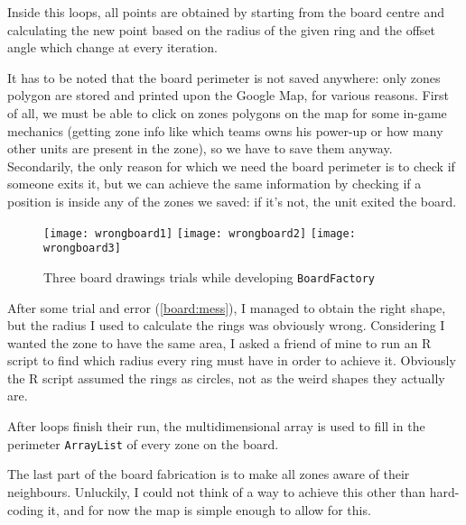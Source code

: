			Inside this loops, all points are obtained by starting from the board centre and calculating the new point based on the radius of the given ring and the offset angle which change at every iteration.
			
			
			
			It has to be noted that the board perimeter is not saved anywhere: only zones polygon are stored and printed upon the Google Map, for various reasons.
			First of all, we must be able to click on zones polygons on the map for some in-game mechanics (getting zone info like which teams owns his power-up or how many other units are present in the zone), so we have to save them anyway.
			Secondarily, the only reason for which we need the board perimeter is to check if someone exits it, but we can achieve the same information by checking if a position is inside any of the zones we saved: if it's not, the unit exited the board.
			
			\begin{figure}[htp]
				\centering
				\texttt{[image: wrongboard1]}
				\hfill %
				\texttt{[image: wrongboard2]}
				\hfill
				\texttt{[image: wrongboard3]}
				
				\caption{Three board drawings trials while developing \lstinline|BoardFactory|}\label{board:mess}
			\end{figure}
			
			After some trial and error (\autoref{board:mess}), I managed to obtain the right shape, but the radius I used to calculate the rings was obviously wrong.
			Considering I wanted the zone to have the same area, I asked a friend of mine to run an R script to find which radius every ring must have in order to achieve it. Obviously the R script assumed the rings as circles, not as the weird shapes they actually are.
			
			After loops finish their run, the multidimensional array is used to fill in the perimeter \lstinline|ArrayList| of every zone on the board.
			
			The last part of the board fabrication is to make all zones aware of their neighbours. Unluckily, I could not think of a way to achieve this other than hard-coding it, and for now the map is simple enough to allow for this.
			
